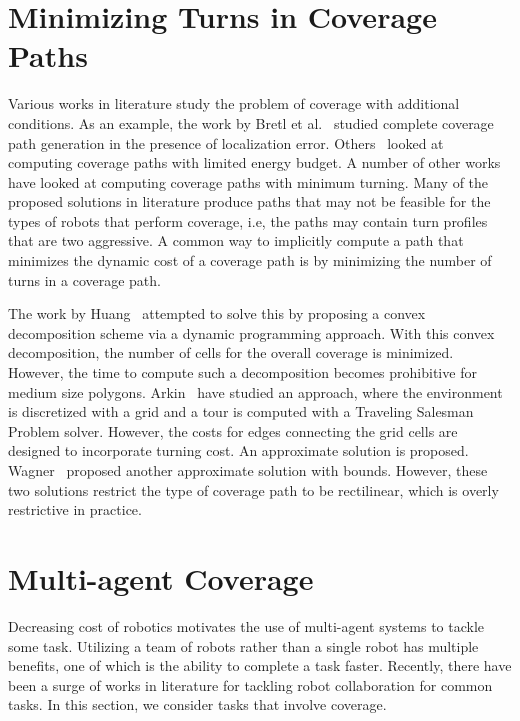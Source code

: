 \documentclass[../main.tex]{subfiles}
\begin{document}
\section{Minimizing Turns in Coverage Paths}
\label{section:minimizing_turns_in_coverage_paths}

Various works in literature study the problem of coverage with additional conditions. As an example, the work by Bretl et al.~\cite{bretl2013robust} studied complete coverage path generation in the presence of localization error. Others~\cite{shnaps2015line} looked at computing coverage paths with limited energy budget. A number of other works have looked at computing coverage paths with minimum turning. Many of the proposed solutions in literature produce paths that may not be feasible for the types of robots that perform coverage, i.e, the paths may contain turn profiles that are two aggressive. A common way to implicitly compute a path that minimizes the dynamic cost of a coverage path is by minimizing the number of turns in a coverage path. 

The work by Huang~\cite{Huang2001optimal} attempted to solve this by proposing a convex decomposition scheme via a dynamic programming approach. With this convex decomposition, the number of cells for the overall coverage is minimized. However, the time to compute such a decomposition becomes prohibitive for medium size polygons. Arkin~\cite{arkin2005optimal} have studied an approach, where the environment is discretized with a grid and a tour is computed with a Traveling Salesman Problem solver. However, the costs for edges connecting the grid cells are designed to incorporate turning cost. An approximate solution is proposed. Wagner~\cite{wagner2001approximation} proposed another approximate solution with bounds. However, these two solutions restrict the type of coverage path to be rectilinear, which is overly restrictive in practice.


\section{Multi-agent Coverage}
\label{section:multi_agent_coverage_lit_review}

Decreasing cost of robotics motivates the use of multi-agent systems to tackle some task. Utilizing a team of robots rather than a single robot has multiple benefits, one of which is the ability to complete a task faster. Recently, there have been a surge of works in literature for tackling robot collaboration for common tasks. In this section, we consider tasks that involve coverage.
\end{document}
